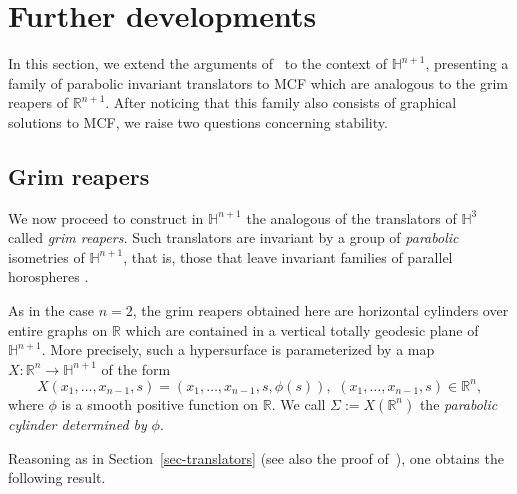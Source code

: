 \documentclass{amsart}[12pt]
\newcommand{\hn}[1]{\h^{#1}}
\theoremstyle{definition}
\theoremstyle{plain}
\newcommand{\R}{\mathbb{R} }
\newcommand{\h}{\mathbb{H} }
\renewcommand{\Sigma}{\varSigma}
\begin{document}
\section{Further developments}\label{secopenprob}


In this section, we extend the arguments
of~\cite[Section~3.2]{dLRS} to the context of $\hn{n+1}$, presenting
a family of parabolic invariant translators to MCF which are analogous
to the grim reapers of $\R^{n+1}$. After noticing
that this family also consists of graphical solutions
to MCF, we raise two questions concerning stability.




\subsection{Grim reapers}
We now proceed to construct in $\h^{n+1}$ the analogous of
the translators of $\h^{3}$ called \emph{grim reapers.}
Such translators are invariant by a
group of {\em parabolic} isometries of $\h^{n+1}$, that is,
those that leave invariant
families of parallel horospheres .

As in the case $n=2$, the grim reapers obtained here are
horizontal cylinders over entire graphs on $\R$ which are contained in
a vertical totally geodesic plane
of \,$\h^{n+1}$. More precisely,
such a hypersurface is parameterized by a map
$X\colon\R^n\to\h^{n+1}$ of the form
\begin{equation*}
X(x_1,\dots, x_{n-1},s)=(x_1,\dots, x_{n-1},s,\phi(s)), \,\, (x_1,\dots, x_{n-1},s)\in\R^n,
\end{equation*}
where $\phi$ is a smooth positive function on $\R.$
We call $\Sigma:=X(\R^n)$ the \emph{parabolic cylinder determined by}
$\phi.$

Reasoning as in Section~\ref{sec-translators} (see also the proof
of~\cite[Lemmas 3.18 and 3.19]{dLRS}), one obtains the
following result.
\end{document}
